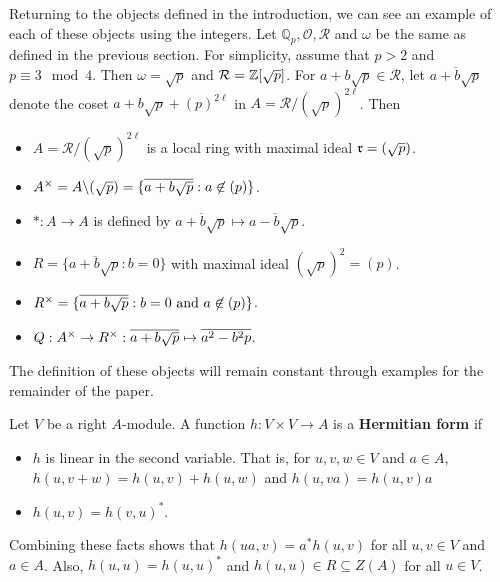 \begin{example}\label{ex2.1}
Returning to the objects defined in the introduction, we can see an example of each of these objects using the \padic integers.
Let $\mathbb{Q}_p, \mathcal{O}, \mathcal{R}$ and $\omega$ be the same as defined in the previous section.
For simplicity, assume that $p > 2$ and $p \equiv 3 \mod 4$.
Then $\omega = \sqrt{p}$ and $\mathcal{R} = \mathbb{Z}[\sqrt{p}]$.
For $a + b \sqrt{p} \in \mathcal{R}$, let $\overline{a + b\sqrt{p}}$ denote the coset $a + b\sqrt{p} + (p)^{2\ell}$ in $A = \mathcal{R} / (\sqrt{p})^{2\ell}$.
Then
\begin{itemize}
\item $A = \mathcal{R}/(\sqrt{p})^{2\ell}$ is a local ring with maximal ideal $\mathfrak{r} = (\sqrt{p})$.

\item $A^\times = A \backslash (\sqrt{p}) = \{\overline{a + b \sqrt{p}} : a \not\in (p) \}$.

\item $*: A \to A$ is defined by $\overline{a + b\sqrt{p}} \mapsto \overline{a - b\sqrt{p}}$.

\item $R = \{\overline{a + b\sqrt{p}} : b = 0\}$ with maximal ideal $(\sqrt{p})^2= (p)$.

\item $R^\times = \{\overline{a + b\sqrt{p}}: b = 0 \text{ and } a \not\in (p)\}$.

\item $Q: A^\times \to R^\times: \overline{a + b\sqrt{p}} \mapsto \overline{a^2 - b^2 p}$.
\end{itemize}
The definition of these objects will remain constant through examples for the remainder of the paper.
\end{example}

Let $V$ be a right $A$-module. 
A function $h: V \times V \to A$ is a \textbf{Hermitian form} if
\begin{itemize}
\item $h$ is linear in the second variable.
That is, for $u, v, w \in V$ and $a \in A$, $h(u, v + w) = h(u, v) + h(u, w)$ and $h(u, va) = h(u, v)a$
\item $h(u,v) = h(v, u)^*$.
\end{itemize}
Combining these facts shows that $h(ua, v) = a^* h(u, v)$ for all $u, v \in V$ and $a \in A$.
Also, $h(u,u) = h(u,u)^*$ and $h(u,u) \in R \subseteq Z(A)$ for all $u \in V$.


